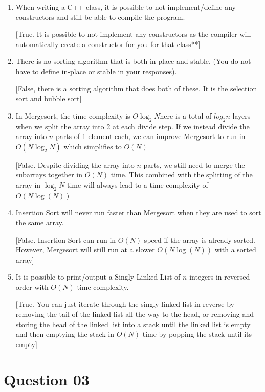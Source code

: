 \documentclass{article}
\begin{document}
\begin{enumerate}[label=(\arabic*)]

\item When writing a C++ class, it is possible to not implement/define any constructors and still
be able to compile the program.

[True. It is possible to not implement any constructors as the compiler will automatically create a constructor for you for that class**]

\item There is no sorting algorithm that is both in-place and stable. (You do not have to define
in-place or stable in your responses).

[False, there is a sorting algorithm that does both of these. It is the selection sort and bubble sort]

\item In Mergesort, the time complexity is $O\log_2N$here is a total of $log_2n$ layers when we split
the array into 2 at each divide step. If we instead divide the array into $n$ parts of 1 element each,
we can improve Mergesort to run in $O(N \log_2N)$ which simplifies to $O(N)$

[False. Despite dividing the array into $n$ parts, we still need to merge the subarrays together in $O(N)$ time. This combined with the splitting of the array in $\log_2N$ time will always lead to a time complexity of $O(N\log (N))$]

\item Insertion Sort will never run faster than Mergesort when they are used to sort the same array.

[False. Insertion Sort can run in $O(N)$ speed if the array is already sorted. However, Mergesort will still run at a slower $O(N\log(N))$ with a sorted array]

\item It is possible to print/output a Singly Linked List of $n$ integers in reversed order with $O(N)$ time
complexity.

[True. You can just iterate through the singly linked list in reverse by removing the tail of the linked list all the way to the head, or removing and storing the head of the linked list into a stack until the linked list is empty and then emptying the stack in $O(N)$ time by popping the stack until its empty]

\end{enumerate}
\section{Question 03}
\end{document}
